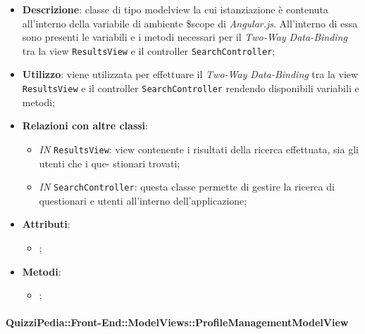 	\begin{itemize}
		\item \textbf{Descrizione}: classe di tipo modelview la cui istanziazione è contenuta all'interno della variabile di ambiente \$scope di \textit{Angular.js}. All'interno di essa sono presenti le variabili e i metodi necessari per il \textit{Two-Way Data-Binding} tra la view \texttt{ResultsView} e il controller \texttt{SearchController};
		\item \textbf{Utilizzo}: viene utilizzata per effettuare il \textit{Two-Way Data-Binding} tra la view \texttt{ResultsView} e il controller \texttt{SearchController} rendendo disponibili variabili e metodi;
		\item \textbf{Relazioni con altre classi}: 
		\begin{itemize}
			\item \textit{IN} \texttt{ResultsView}: view contenente i risultati della ricerca effettuata, sia gli utenti che i que- stionari trovati; 
			\item \textit{IN} \texttt{SearchController}: questa classe permette di gestire la ricerca di questionari e utenti all’interno dell’applicazione;
		\end{itemize}
		\item \textbf{Attributi}: 
		\begin{itemize}
			\item ;
		\end{itemize}
		\item \textbf{Metodi}: 
		\begin{itemize}
			\item ;
		\end{itemize}
	\end{itemize}	


	\paragraph{QuizziPedia::Front-End::ModelViews::ProfileManagementModelView}
	
	\label{QuizziPedia::Front-End::ModelViews::ProfileManagementModelView}
	
